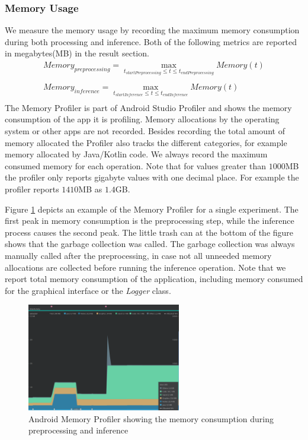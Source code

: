 \subsubsection{Memory Usage}
We measure the memory usage by recording the maximum memory consumption during both processing and inference. Both of the following metrics are reported in megabytes(MB) in the result section.
\begin{equation*}
\begin{gathered}
Memory_{preprocessing} = \max\limits_{t_{startPreprocessing} \leq t \leq t_{endPreprocessing}} Memory(t)\\\\
Memory_{inference} = \max\limits_{t_{startInference} \leq t \leq t_{endInference}} Memory(t)\\
\end{gathered}
\end{equation*}
The Memory Profiler is part of Android Studio Profiler and shows the memory consumption of the app it is profiling. Memory allocations by the operating system or other apps are not recorded. Besides recording the total amount of memory allocated the Profiler also tracks the different categories, for example memory allocated by Java/Kotlin code. We always record the maximum consumed memory for each operation.
Note that for values greater than $1000$MB the profiler only reports gigabyte values with one decimal place. For example the profiler reports $1410$MB as $1.4$GB.

Figure \ref{fig:prof_mem} depicts an example of the Memory Profiler for a single experiment. The first peak in memory consumption is the preprocessing step, while the inference process causes the second peak.
The little trash can at the bottom of the figure shows that the garbage collection was called. The garbage collection was always manually called after the preprocessing, in case not all unneeded memory allocations are collected before running the inference operation. 
Note that we report total memory consumption of the application, including memory consumed for the graphical interface or the \emph{Logger} class.
\begin{figure}[H]
\centering
\includegraphics[width=0.6\textwidth]{./Bilder/profiler_MEM}
\caption{Android Memory Profiler showing the memory consumption during preprocessing and inference}
\label{fig:prof_mem}
\end{figure}
